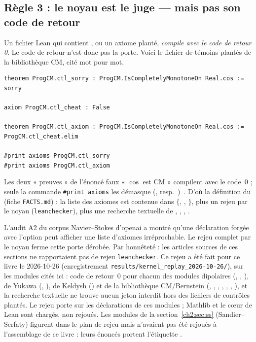 \subsection{Règle 3 : le noyau est le juge --- mais pas son code de retour}\label{ch2:ssec:noyau}
Un fichier Lean qui contient , ou un axiome planté, \emph{compile avec le code de retour 0}. Le code de
retour n'est donc pas la porte. Voici le fichier de témoins plantés de la bibliothèque CM, cité mot pour mot.
\begin{leanbox}
\begin{lstlisting}[style=chdeux]
theorem ProgCM.ctl_sorry : ProgCM.IsCompletelyMonotoneOn Real.cos := sorry

axiom ProgCM.ctl_cheat : False

theorem ProgCM.ctl_axiom : ProgCM.IsCompletelyMonotoneOn Real.cos := ProgCM.ctl_cheat.elim

#print axioms ProgCM.ctl_sorry
#print axioms ProgCM.ctl_axiom
\end{lstlisting}
\end{leanbox}
\noindent Les deux « preuves » de l'énoncé faux « $\cos$ est CM » compilent avec le code~0 ; seule la commande
\texttt{\#print axioms} les démasque (, resp.\ )~\cite{p3}. D'où la définition du
\tierA{} (fiche \texttt{FACTS.md}) : la liste des axiomes est contenue dans $\{$, ,
$\}$, plus un rejeu par le noyau (\texttt{leanchecker}), plus une recherche textuelle de
, , , .

\begin{remark}\label{ch2:rem:skip}
L'audit A2 du corpus Navier--Stokes d'openai a montré qu'une déclaration forgée avec l'option
 peut afficher une liste d'axiomes irréprochable. Le rejeu complet par le noyau ferme cette
porte dérobée. Par honnêteté : les articles sources de ces sections ne rapportaient pas de rejeu \texttt{leanchecker}. Ce rejeu a été
fait pour ce livre le 2026-10-26 (enregistrement \texttt{results/kernel\_replay\_2026-10-26/}), sur les modules
cités ici : code de retour~0 pour chacun des modules dipolaires (, ,
), de Yukawa (, ), de Keldysh () et de la
bibliothèque CM/Bernstein (, , , , ,
, ), et la recherche textuelle ne trouve aucun jeton interdit hors des fichiers de contrôles
plantés. Le rejeu porte sur les déclarations de ces modules ; Mathlib et le cœur de Lean sont chargés, non rejoués.
Les modules de la section~\ref{ch2:sec:ss} (Sandier--Serfaty) figurent dans le plan de rejeu mais n'avaient pas été
rejoués à l'assemblage de ce livre : leurs énoncés portent l'étiquette \tierAs{}.
\end{remark}

